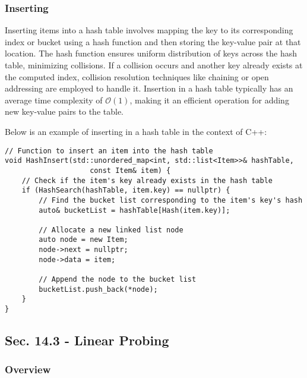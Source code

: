 \subsubsection{Inserting}

Inserting items into a hash table involves mapping the key to its corresponding index or bucket using a hash function and then storing the key-value pair at that location. The hash function ensures uniform distribution 
of keys across the hash table, minimizing collisions. If a collision occurs and another key already exists at the computed index, collision resolution techniques like chaining or open addressing are employed to handle it. 
Insertion in a hash table typically has an average time complexity of $\mathcal{O}(1)$, making it an efficient operation for adding new key-value pairs to the table.

\begin{solution}

Below is an example of inserting in a hash table in the context of C++:

\horizontalline

\begin{verbatim}
// Function to insert an item into the hash table
void HashInsert(std::unordered_map<int, std::list<Item>>& hashTable, 
                    const Item& item) {
    // Check if the item's key already exists in the hash table
    if (HashSearch(hashTable, item.key) == nullptr) {
        // Find the bucket list corresponding to the item's key's hash
        auto& bucketList = hashTable[Hash(item.key)];

        // Allocate a new linked list node
        auto node = new Item;
        node->next = nullptr;
        node->data = item;

        // Append the node to the bucket list
        bucketList.push_back(*node);
    }
}
\end{verbatim}

\horizontalline

\end{solution}

\subsection*{Sec. 14.3 - Linear Probing}

\subsubsection{Overview}

